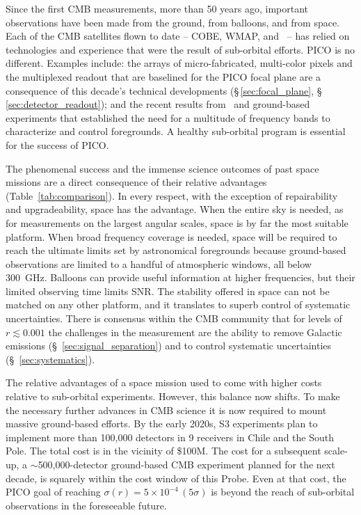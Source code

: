 \documentclass[PICOReport.tex]{subfiles}
\begin{document}
Since the first \ac{CMB} measurements, more than 50 years ago, important observations have been made from the ground, from balloons, and from space. Each of the CMB satellites flown to date -- COBE, WMAP, and \planck\ -- has relied on technologies and experience that were the result of sub-orbital efforts. PICO is no different. Examples include: the arrays of micro-fabricated, multi-color pixels and the multiplexed readout that are baselined for the PICO focal plane are a consequence of this decade's technical developments (\S\,\ref{sec:focal_plane}, \S\,\ref{sec:detector_readout}); and the recent results from \planck \ and ground-based experiments that established the need for a multitude of frequency bands to characterize and control foregrounds.  A healthy sub-orbital program is essential for the success of PICO. 


The phenomenal success and the immense science outcomes of past space missions are a direct consequence of their relative advantages (Table~\ref{tab:comparison}). In every respect, with the exception of repairability and upgradeability, space has the advantage. When the entire sky is needed, as for measurements on the largest angular scales, space is by far the most suitable platform.  When broad frequency coverage is needed, space will be required to reach the ultimate limits set by astronomical foregrounds because ground-based observations are limited to a handful of atmospheric windows, all below 300~GHz. Balloons can provide useful information at higher frequencies, but their limited observing time limits \ac{SNR}. The stability offered in space can not be matched on any other platform, and it translates to superb control of systematic uncertainties. There is consensus within the CMB community that for levels of $r \lesssim 0.001$ the challenges in the measurement are the ability to remove Galactic emissions (\S~\ref{sec:signal_separation}) and to control systematic uncertainties (\S~\ref{sec:systematics}). 

The relative advantages of a space mission used to come with higher costs relative to sub-orbital experiments. However, this balance now shifts. To make the necessary further advances in CMB science it is now required to mount massive ground-based efforts.  By the early 2020s, S3 experiments plan to implement more than 100,000 detectors in 9 receivers in Chile and the South Pole. The total cost is in the vicinity of \$100M. The cost for a subsequent scale-up, a $\sim$500,000-detector ground-based CMB experiment planned for the next decade, is squarely within the cost window of this Probe. Even at that cost, the PICO goal of reaching $\sigma(r) = 5 \times 10^{-4}\,(5 \sigma) $ is beyond the reach of sub-orbital observations in the foreseeable future.  
\end{document}
